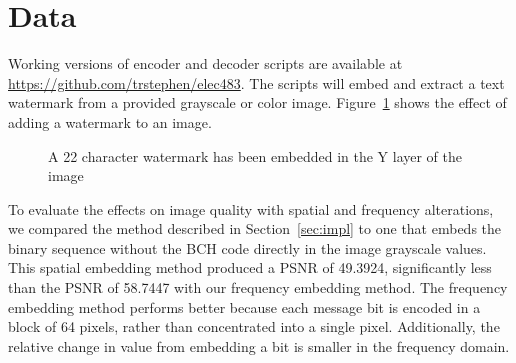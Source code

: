 \section{Data}\label{sec:data}
Working versions of encoder and decoder scripts are available at \url{https://github.com/trstephen/elec483}.
The scripts will embed and extract a text watermark from a provided grayscale or color image.
Figure~\ref{fig:wm} shows the effect of adding a watermark to an image.

\begin{figure}[htpb]
  \centering
  
  \caption{A 22 character watermark has been embedded in the Y layer of the image}
  \label{fig:wm}
\end{figure}

To evaluate the effects on image quality  with spatial and frequency alterations, we compared the method described in Section~\ref{sec:impl} to one that embeds the binary sequence without the BCH code directly in the image grayscale values.
This spatial embedding method produced a PSNR of 49.3924, significantly less than the PSNR of 58.7447 with our frequency embedding method.
The frequency embedding method performs better because each message bit is encoded in a block of 64 pixels, rather than concentrated into a single pixel.
Additionally, the relative change in value from embedding a bit is smaller in the frequency domain.


